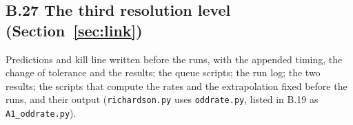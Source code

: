 \subsection*{B.27 The third resolution level (Section~\ref{sec:link})}
Predictions and kill line written before the runs, with the appended timing, the change of tolerance and the results; the queue scripts; the run log; the two results; the scripts that compute the rates and the extrapolation fixed before the runs, and their output (\texttt{richardson.py} uses \texttt{oddrate.py}, listed in B.19 as \texttt{A1\_oddrate.py}).










